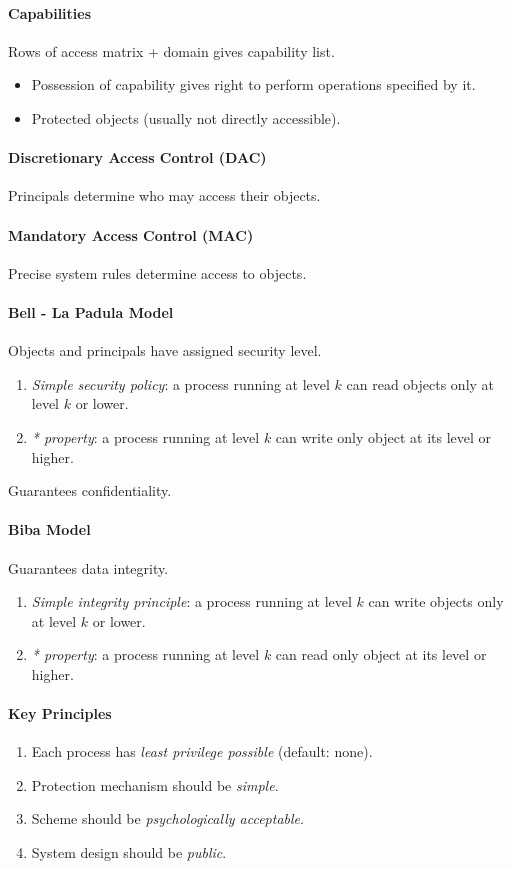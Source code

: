 \documentclass[twocolumn,english]{article}
\begin{document}
\paragraph{Capabilities}

Rows of access matrix + domain gives capability list.
\begin{itemize}
\item Possession of capability gives right to perform operations specified
by it.
\item Protected objects (usually not directly accessible).
\end{itemize}

\paragraph{Discretionary Access Control (DAC)}

Principals determine who may access their objects.

\paragraph{Mandatory Access Control (MAC)}

Precise system rules determine access to objects.

\paragraph{Bell - La Padula Model}

Objects and principals have assigned security level.
\begin{enumerate}
\item \emph{Simple security policy}: a process running at level $k$ can
read objects only at level $k$ or lower.
\item \emph{{*} property}: a process running at level $k$ can write only
object at its level or higher.
\end{enumerate}
Guarantees confidentiality.

\paragraph{Biba Model}

Guarantees data integrity.
\begin{enumerate}
\item \emph{Simple integrity principle}: a process running at level $k$
can write objects only at level $k$ or lower.
\item \emph{{*} property}: a process running at level $k$ can read only
object at its level or higher.
\end{enumerate}

\paragraph{Key Principles}
\begin{enumerate}
\item Each process has \emph{least privilege possible} (default: none).
\item Protection mechanism should be \emph{simple}.
\item Scheme should be \emph{psychologically acceptable}.
\item System design should be \emph{public}.
\end{enumerate}
\end{document}
